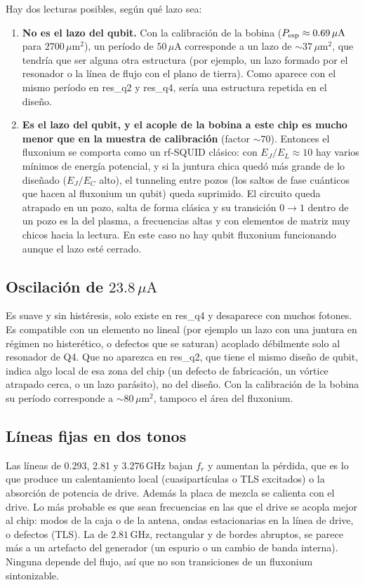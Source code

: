 \documentclass[11pt,a4paper]{article}
\newcommand{\uA}{\,\mu\mathrm{A}}
\newcommand{\GHz}{\,\mathrm{GHz}}
\newcommand{\fr}{f_r}
\begin{document}
Hay dos lecturas posibles, según qué lazo sea:
\begin{enumerate}
  \item \textbf{No es el lazo del qubit.} Con la calibración de la bobina ($P_{\rm esp} \approx 0.69\uA$ para
    $2700\,\mu\mathrm{m}^2$), un período de $50\uA$ corresponde a un lazo de $\sim 37\,\mu\mathrm{m}^2$, que tendría
    que ser alguna otra estructura (por ejemplo, un lazo formado por el resonador o la línea de flujo con el plano de
    tierra). Como aparece con el mismo período en res\_q2 y res\_q4, sería una estructura repetida en el diseño.
  \item \textbf{Es el lazo del qubit, y el acople de la bobina a este chip es mucho menor que en la muestra de
    calibración} (factor $\sim 70$). Entonces el fluxonium se comporta como un rf-SQUID clásico: con
    $E_J/E_L \approx 10$ hay varios mínimos de energía potencial, y si la juntura chica quedó más grande de lo
    diseñado ($E_J/E_C$ alto), el tunneling entre pozos (los saltos de fase cuánticos que hacen al fluxonium un qubit)
    queda suprimido. El circuito queda atrapado en un pozo, salta de forma clásica y su transición $0\to1$ dentro de
    un pozo es la del plasma, a frecuencias altas y con elementos de matriz muy chicos hacia la lectura. En este caso
    no hay qubit fluxonium funcionando aunque el lazo esté cerrado.
\end{enumerate}

\subsection{Oscilación de $23.8\uA$}

Es suave y sin histéresis, solo existe en res\_q4 y desaparece con muchos fotones. Es compatible con un elemento
no lineal (por ejemplo un lazo con una juntura en régimen no histerético, o defectos que se saturan) acoplado
débilmente solo al resonador de Q4. Que no aparezca en res\_q2, que tiene el mismo diseño de qubit, indica algo local
de esa zona del chip (un defecto de fabricación, un vórtice atrapado cerca, o un lazo parásito), no del diseño. Con la
calibración de la bobina su período corresponde a $\sim 80\,\mu\mathrm{m}^2$, tampoco el área del fluxonium.

\subsection{Líneas fijas en dos tonos}

Las líneas de 0.293, 2.81 y $3.276\GHz$ bajan $\fr$ y aumentan la pérdida, que es lo que produce un calentamiento
local (cuasipartículas o TLS excitados) o la absorción de potencia de drive. Además la placa de mezcla se calienta
con el drive. Lo más probable es que sean frecuencias en las que el drive se acopla mejor al chip: modos de la caja o
de la antena, ondas estacionarias en la línea de drive, o defectos (TLS). La de $2.81\GHz$, rectangular y de bordes
abruptos, se parece más a un artefacto del generador (un espurio o un cambio de banda interna). Ninguna depende del
flujo, así que no son transiciones de un fluxonium sintonizable.
\end{document}
